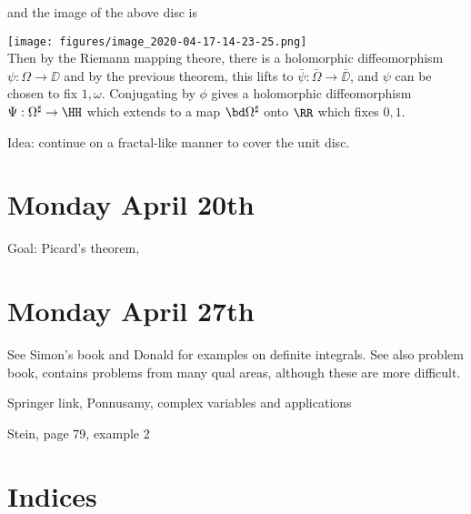 and the image of the above disc is

\texttt{[image: figures/image\_2020-04-17-14-23-25.png]}\\

Then by the Riemann mapping theore, there is a holomorphic
diffeomorphism \(\psi: \Omega \to \DD\) and by the previous theorem,
this lifts to \(\bar \psi: \bar \Omega \to \bar \DD\), and \(\psi\) can
be chosen to fix \(1, \omega\). Conjugating by \(\phi\) gives a
holomorphic diffeomorphism \(\Psi: \Omega^\sharp \to \HH\) which extends
to a map \(\bd \Omega^{\sharp}\) onto \(\RR\) which fixes \(0, 1\).

Idea: continue on a fractal-like manner to cover the unit disc.

\hypertarget{monday-april-20th}{%
\section{Monday April 20th}\label{monday-april-20th}}

Goal: Picard's theorem,

\hypertarget{monday-april-27th}{%
\section{Monday April 27th}\label{monday-april-27th}}

See Simon's book and Donald for examples on definite integrals. See also
problem book, contains problems from many qual areas, although these are
more difficult.

Springer link, Ponnusamy, complex variables and applications

Stein, page 79, example 2

\newpage

\newpage
\section{Indices}

\renewcommand{\listtheoremname}{Definitions}
\listoftheorems[ignoreall,show={definition}, numwidth=3.5em]

\renewcommand{\listtheoremname}{Theorems}
\listoftheorems[ignoreall,show={theorem,proposition}, numwidth=3.5em]

\renewcommand{\listtheoremname}{Exercises}
\listoftheorems[ignoreall,show={exercise}, numwidth=3.5em]

\listoffigures


\printbibliography[title=Bibliography]



